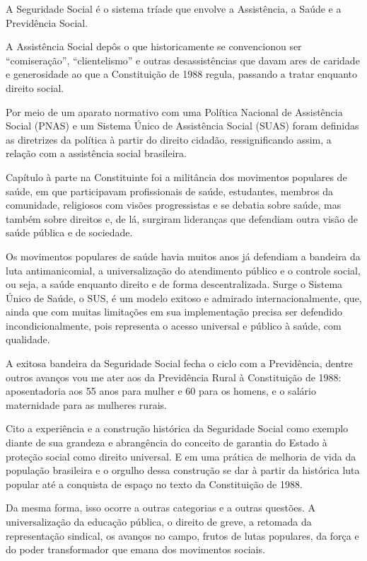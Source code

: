 A Seguridade Social é o sistema tríade que envolve a Assistência, a
Saúde e a Previdência Social.

A Assistência Social depôs o que historicamente se convencionou ser
``comiseração'', ``clientelismo'' e outras desassistências que davam
ares de caridade e generosidade ao que a Constituição de 1988 regula,
passando a tratar enquanto direito social.

Por meio de um aparato normativo com uma Política Nacional de
Assistência Social (PNAS) e um Sistema Único de Assistência Social
(SUAS) foram definidas as diretrizes da política à partir do direito
cidadão, ressignificando assim, a relação com a assistência social
brasileira.

Capítulo à parte na Constituinte foi a militância dos movimentos
populares de saúde, em que participavam profissionais de saúde,
estudantes, membros da comunidade, religiosos com visões progressistas e
se debatia sobre saúde, mas também sobre direitos e, de lá, surgiram
lideranças que defendiam outra visão de saúde pública e de sociedade.

Os movimentos populares de saúde havia muitos anos já defendiam a
bandeira da luta antimanicomial, a universalização do atendimento
público e o controle social, ou seja, a saúde enquanto direito e de
forma descentralizada. Surge o Sistema Único de Saúde, o SUS, é um
modelo exitoso e admirado internacionalmente, que, ainda que com muitas
limitações em sua implementação precisa ser defendido
incondicionalmente, pois representa o acesso universal e público à
saúde, com qualidade.

A exitosa bandeira da Seguridade Social fecha o ciclo com a Previdência,
dentre outros avanços vou me ater aos da Previdência Rural à
Constituição de 1988: aposentadoria aos 55 anos para mulher e 60 para os
homens, e o salário maternidade para as mulheres rurais.

Cito a experiência e a construção histórica da Seguridade Social como
exemplo diante de sua grandeza e abrangência do conceito de garantia do
Estado à proteção social como direito universal. E em uma prática de
melhoria de vida da população brasileira e o orgulho dessa construção se
dar à partir da histórica luta popular até a conquista de espaço no
texto da Constituição de 1988.

Da mesma forma, isso ocorre a outras categorias e a outras questões. A
universalização da educação pública, o direito de greve, a retomada da
representação sindical, os avanços no campo, frutos de lutas populares,
da força e do poder transformador que emana dos movimentos sociais.

